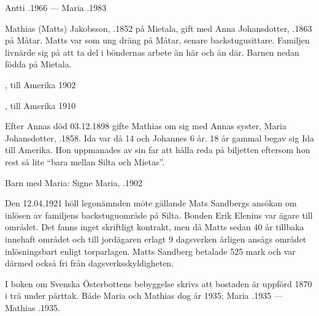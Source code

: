 Antti .1966  ---  Maria .1983


Mathias (Matts) Jakobsson, .1852 på Mietala, gift med Anna Johansdotter, .1863 på Måtar. Matts var som ung dräng på Måtar, senare backstugusittare. Familjen livnärde sig på att ta del i böndernas arbete än här och än där. Barnen nedan födda på Mietala.
\begin{jhchildren}
  \item {}, till Amerika 1902
  \item {}
  \item {}
  \item {}
  \item {}, till Amerika 1910
  \item {}
\end{jhchildren}

Efter Annas död 03.12.1898 gifte Mathias om sig med Annas syster, Maria Johansdotter,  .1858. Ida var då 14 och Johannes 6 år. 18 år gammal begav sig Ida till Amerika. Hon uppmanades av sin far att hålla reda på biljetten eftersom hon rest så lite ``bara mellan Silta och Mietas''.

Barn med Maria: Signe Maria, .1902

Den 12.04.1921 höll legonämnden möte gällande Mats Sandbergs ansökan om inlösen av familjens backstuguområde på Silta. Bonden Erik Elenius var ägare till området. Det fanns inget skriftligt kontrakt, men då Matts sedan 40 år tillbaka innehaft området och till jordägaren erlagt 9 dagsverken årligen ansågs området inlösningsbart enligt torparlagen. Matts Sandberg betalade 525 mark och var därmed också fri från dagsverksskyldigheten.

I boken om Svenska Österbottens bebyggelse skrivs att bostaden är uppförd 1870 i trä under pärttak. Både Maria och Mathias dog år 1935; Maria .1935  ---  Mathias .1935.





